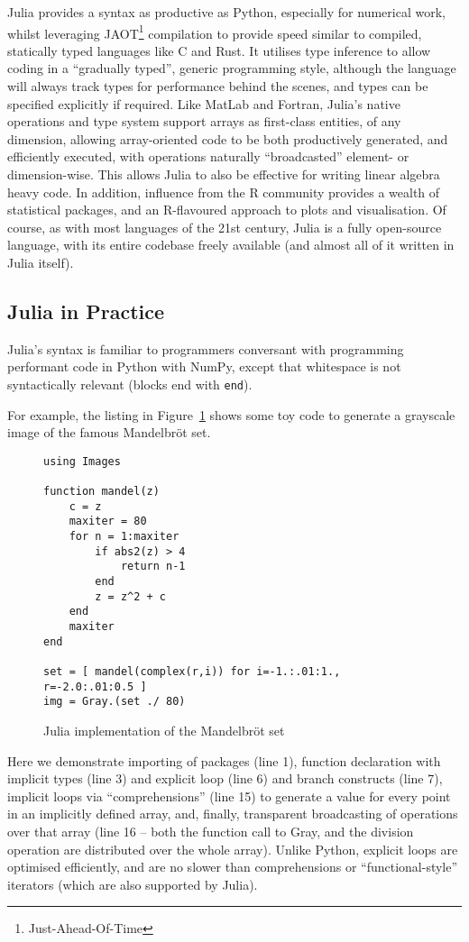 \documentclass{webofc}
\begin{document}
Julia provides a syntax as productive as Python, especially for numerical work,
whilst leveraging JAOT\footnote{Just-Ahead-Of-Time} compilation to provide speed
similar to compiled, statically typed languages like C and Rust. It utilises
type inference to allow coding in a ``gradually typed'', generic programming
style, although the language will always track types for performance behind the
scenes, and types can be specified explicitly if required. Like MatLab and
Fortran, Julia's native operations and type system support arrays as first-class
entities, of any dimension, allowing array-oriented code to be both productively
generated, and efficiently executed, with operations naturally ``broadcasted''
element- or dimension-wise. This allows Julia to also be effective for writing
linear algebra heavy code. In addition, influence from the R community provides
a wealth of statistical packages, and an R-flavoured approach to plots and
visualisation. Of course, as with most languages of the 21st century, Julia is a
fully open-source language, with its entire codebase freely available (and
almost all of it written in Julia itself).

\subsection{Julia in Practice}
\label{sec:juliainpractice}

Julia's syntax is familiar to programmers conversant with programming performant
code in Python with NumPy, except that whitespace is not syntactically relevant
(blocks end with \texttt{end}).

For example, the listing in Figure~\ref{code:madelbrot} shows some toy code to
generate a grayscale image of the famous Mandelbröt set.

\begin{figure}[!ht]
\centering
\begin{verbatim}
using Images

function mandel(z)
    c = z
    maxiter = 80
    for n = 1:maxiter
        if abs2(z) > 4
            return n-1
        end
        z = z^2 + c
    end
    maxiter
end

set = [ mandel(complex(r,i)) for i=-1.:.01:1., r=-2.0:.01:0.5 ]
img = Gray.(set ./ 80)
\end{verbatim}
\caption{Julia implementation of the Mandelbr\"{o}t set}
\label{code:madelbrot}
\end{figure}

Here we demonstrate importing of packages (line 1), function declaration with
implicit types (line 3) and explicit loop (line 6) and branch constructs (line
7), implicit loops via ``comprehensions'' (line 15) to generate a  value for
every point in an implicitly defined array, and, finally, transparent
broadcasting of operations over that array (line 16 -- both the function call to
Gray, and the division operation are distributed over the whole array). Unlike
Python, explicit loops are optimised efficiently, and are no slower than
comprehensions or ``functional-style'' iterators (which are also supported by
Julia).
\end{document}
